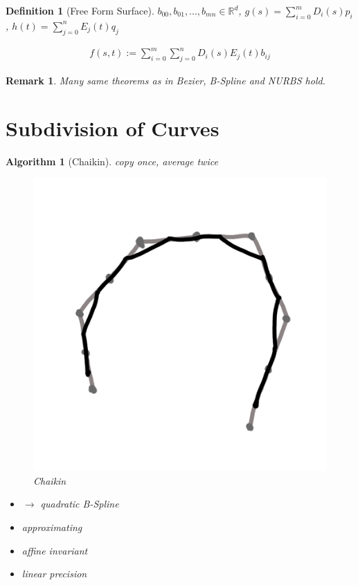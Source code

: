 \documentclass[conference]{IEEEtran}
\newtheorem{algorithm}{Algorithm}
\newtheorem{definition}{Definition}
\newtheorem{remark}{Remark}
\begin{document}
\begin{definition}[Free Form Surface]
	$b_{00}, b_{01}, ..., b_{mn} \in \mathbb{R}^d$, $g(s) = \sum_{i=0}^{m} D_i(s) p_i$, $h(t) = \sum_{j=0}^{n} E_j(t) q_j$
	
	\begin{align*}
		f(s,t) := \sum_{i=0}^{m} \sum_{j=0}^{n} D_i(s) E_j(t) b_{ij}
	\end{align*}
\end{definition}

\begin{remark}
	Many same theorems as in Bezier, B-Spline and NURBS hold.
\end{remark}

\section{Subdivision of Curves}

\begin{algorithm}[Chaikin]
	copy once, average twice
	
	\begin{figure}[h!]
		\centering
		\includegraphics[width=0.5\linewidth]{figures/chaikin_short}
		\caption{Chaikin}
	\end{figure}
	
	\begin{itemize}
		\item $\rightarrow$ quadratic B-Spline
		\item approximating
		\item affine invariant
		\item linear precision
	\end{itemize}
\end{algorithm}
\end{document}
